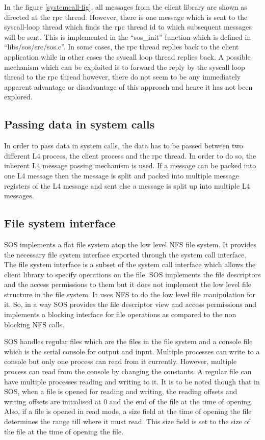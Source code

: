 \documentclass[a4paper, 11pt]{article}
\begin{document}
In the figure \ref{systemcall-fig}, all messages from the client
library are shown as directed at the rpc thread. However, there is one
message which is sent to the syscall-loop thread which finds the rpc
thread id to which subsequent messages will be sent. This is
implemented in the ``sos\_init'' function which is defined in
``libs/sos/src/sos.c''. In some cases, the rpc thread replies back to
the client application while in other cases the syscall loop thread
replies back. A possible mechanism which can be exploited is to
forward the reply by the syscall loop thread to the rpc thread
however, there do not seem to be any immediately apparent advantage or
disadvantage of this approach and hence it has not been explored.

\subsection{Passing data in system calls}
In order to pass data in system calls, the data has to be passed
between two different L4 process, the client process and the rpc
thread. In order to do so, the inherent L4 message passing mechanism
is used. If a message can be packed into one L4 message then the message
is split and packed into multiple message registers of the L4 message
and sent else a message is split up into multiple L4 messages.
\subsection{File system interface}
SOS implements a flat file system atop the low level NFS file
system. It provides the necessary file system interface exported
through the system call interface. The file system interface is a
subset of the system call interface which allows the client library to
specify operations on the file. SOS implements the file descriptors
and the access permissions to them but it does not implement the low
level file structure in the file system. It uses NFS to do the low
level file manipulation for it. So, in a way SOS provides the file
descriptor view and access permissions and implements a blocking
interface for file operations as compared to the non blocking NFS
calls.

SOS handles regular files which are the files in the file system and a
console file which is the serial console for output and
input. Multiple processes can write to a console but only one process
can read from it currently. However, multiple process can read from
the console by changing the constants. A regular file can have
multiple processes reading and writing to it. It is to be noted though
that in SOS, when a file is opened for reading and writing, the
reading offsets and writing offsets are initialised at 0 and the end
of the file at the time of opening. Also, if a file is opened in read
mode, a size field at the time of opening the file determines the range
till where it must read. This size field is set to the size of the
file at the time of opening the file.
\end{document}
